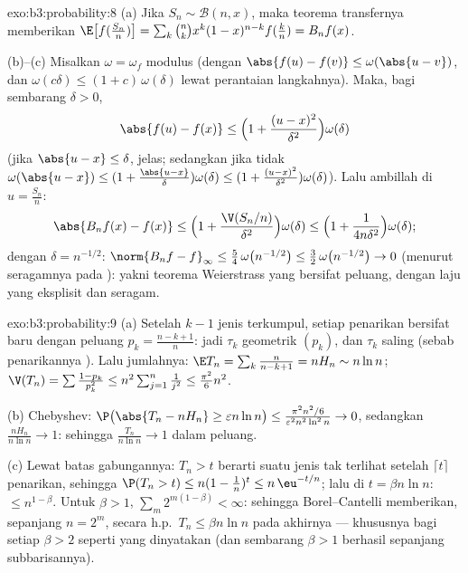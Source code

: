 \begin{solution}{exo:b3:probability:8}
(a) Jika $S_n \sim \mathcal B(n, x)$, maka teorema transfernya
memberikan $\E\bigl[f(\frac{S_n}n)\bigr] =
\sum_k\binom nkx^k(1-x)^{n-k}f(\frac kn) = B_nf(x)$.

(b)--(c) Misalkan $\omega = \omega_f$ modulus 
(dengan $\abs{f(u) - f(v)} \leq \omega(\abs{u - v})$, dan $\omega(c
\delta) \leq (1 + c)\,\omega(\delta)$ lewat perantaian langkahnya).
Maka, bagi sembarang $\delta > 0$,
\[
\abs{f(u) - f(x)} \leq \Bigl(1 + \frac{(u -
x)^2}{\delta^2}\Bigr)\omega(\delta)
\]
(jika $\abs{u - x} \leq \delta$, jelas; sedangkan jika tidak
$\omega(\abs{u-x}) \leq (1 + \frac{\abs{u-x}}\delta)
\omega(\delta) \leq (1 + \frac{(u-x)^2}{\delta^2})
\omega(\delta)$). Lalu ambillah  di $u = \frac{S_n}n$:
\[
\abs{B_nf(x) - f(x)} \leq
\Bigl(1 + \frac{\V(S_n/n)}{\delta^2}\Bigr)\omega(\delta)
\leq \Bigl(1 + \frac{1}{4n\delta^2}\Bigr)\omega(\delta) ;
\]
dengan $\delta = n^{-1/2}$: $\norm{B_nf - f}_\infty \leq
\frac54\,\omega\bigl(n^{-1/2}\bigr) \leq
\frac32\,\omega\bigl(n^{-1/2}\bigr) \to 0$ (menurut 
seragamnya pada ): yakni teorema Weierstrass yang bersifat peluang,
dengan laju yang eksplisit dan seragam.
\end{solution}

\begin{solution}{exo:b3:probability:9}
(a) Setelah $k - 1$ jenis terkumpul, setiap penarikan bersifat baru dengan
peluang $p_k = \frac{n-k+1}n$: jadi $\tau_k$ geometrik
$(p_k)$, dan $\tau_k$ saling  (sebab penarikannya ).
Lalu jumlahnya: $\E T_n = \sum_k\frac n{n-k+1} = nH_n \sim n\ln n$;
$\V(T_n) = \sum\frac{1 - p_k}{p_k^2} \leq
n^2\sum_{j=1}^n\frac1{j^2} \leq \frac{\pi^2}6n^2$.

(b) Chebyshev: $\P\bigl(\abs{T_n - nH_n} \geq \varepsilon
n\ln n\bigr) \leq \frac{\pi^2n^2/6}{\varepsilon^2n^2\ln^2n}
\to 0$, sedangkan $\frac{nH_n}{n\ln n} \to 1$: sehingga $\frac{T_n}{n\ln n}
\to 1$ dalam peluang.

(c) Lewat batas gabungannya: $T_n > t$ berarti suatu jenis tak terlihat setelah
$\lceil t\rceil$ penarikan, sehingga $\P(T_n > t) \leq n(1 -
\frac1n)^{t} \leq n\,\eu^{-t/n}$; lalu di $t = \beta n\ln n$:
$\leq n^{1 - \beta}$. Untuk $\beta > 1$, $\sum_m
2^{m(1-\beta)} < \infty$: sehingga Borel--Cantelli memberikan, sepanjang $n =
2^m$, secara h.p.\ $T_n \leq \beta n\ln n$ pada akhirnya --- khususnya
bagi setiap $\beta > 2$ seperti yang dinyatakan (dan sembarang $\beta > 1$
berhasil sepanjang subbarisannya).
\end{solution}

